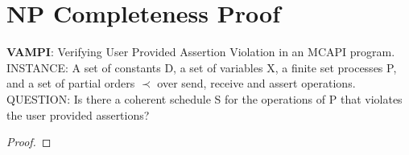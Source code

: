 \section{NP Completeness Proof} 

\begin{definition}
\textbf{VAMPI}: Verifying User Provided Assertion Violation in an MCAPI program.\\
INSTANCE: A set of constants D, a set of variables X, a finite set processes P, and a set of partial orders $\prec$ over
send, receive and assert operations.\\
QUESTION: Is there a coherent schedule S for the operations of P that violates the user provided assertions?
\label{def:np1}
\end{definition}

\begin{proof}
\end{proof}

